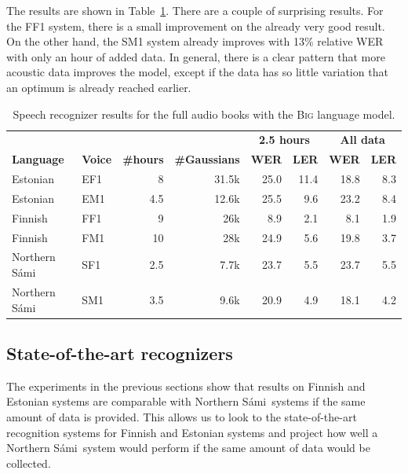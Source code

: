 \documentclass[b5paper]{article}
\newcommand{\ns}{Northern Sámi}
\newcommand{\ds}[1]{\textsc{#1}}
\begin{document}
The results are shown in Table~\ref{tbl:resultbigcomp}.  There are a couple of surprising results. For the FF1 system, there is a small improvement on the already very good result. On the other hand, the SM1 system already improves with 13\% relative WER with only an hour of added data. In general, there is a clear pattern that more acoustic data improves the model, except if the data has so little variation that an optimum is already reached earlier.



\begin{table}
\centering
\begin{tabular}{llrr|rr|rr}
& & & & \multicolumn{2}{|c}{\textbf{2.5 hours}} & \multicolumn{2}{|c}{\textbf{All data}} \\
\textbf{Language} & \textbf{Voice} & \textbf{\#hours}  &\textbf{\#Gaussians} & \textbf{WER} & \textbf{LER}& \textbf{{WER}} & \textbf{LER} \\\hline %
Estonian & EF1 & 8 &31.5k & 25.0  & 11.4 & 18.8 & 8.3  \\
Estonian & EM1& 4.5& 12.6k&25.5 & 9.6  & 23.2 & 8.4  \\
Finnish & FF1 & 9 & 26k & 8.9 & 2.1  & 8.1 &  1.9  \\
Finnish & FM1 & 10 & 28k & 24.9 & 5.6  & 19.8  & 3.7    \\
\ns & SF1 & 2.5   & 7.7k & 23.7  & 5.5  & 23.7  & 5.5  \\
\ns &SM1 & 3.5 &9.6k & 20.9 & 4.9  & 18.1  & 4.2   \\
\end{tabular}
\caption{Speech recognizer results for the full audio books with the \ds{Big} language model.\label{tbl:resultbigcomp}}
\end{table}


\subsection{State-of-the-art recognizers}
The experiments in the previous sections show that results on Finnish and Estonian systems are comparable with \ns\ systems if the same amount of data is provided. This allows us to look to the state-of-the-art recognition systems for Finnish and Estonian systems and project how well a \ns\ system would perform if the same amount of data would be collected.
\end{document}
